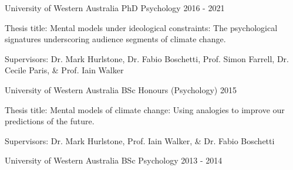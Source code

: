 

\begin{cventries}

  \cventry
    {University of Western Australia} %
    {PhD Psychology} %
    {}%
    {2016 - 2021} %
    {
      \begin{cvitems} %
        \item {Thesis title: Mental models under ideological constraints: The psychological signatures underscoring audience segments of climate change.}
        \item {Supervisors: Dr. Mark Hurlstone, Dr. Fabio Boschetti, Prof. Simon Farrell, Dr. Cecile Paris, \& Prof. Iain Walker}
      \end{cvitems}
    }

  \cventry
    {University of Western Australia} %
    {BSc Honours (Psychology)} %
    {} %
    {2015} %
    {
      \begin{cvitems} %
        \item {Thesis title: Mental models of climate change: Using analogies to improve our predictions of the future.}
        \item {Supervisors: Dr. Mark Hurlstone, Prof. Iain Walker, \& Dr. Fabio Boschetti}
      \end{cvitems}
    }

  \cventry
    {University of Western Australia} %
    {BSc Psychology} %
    {} %
    {2013 - 2014} %
    {}

\end{cventries}
